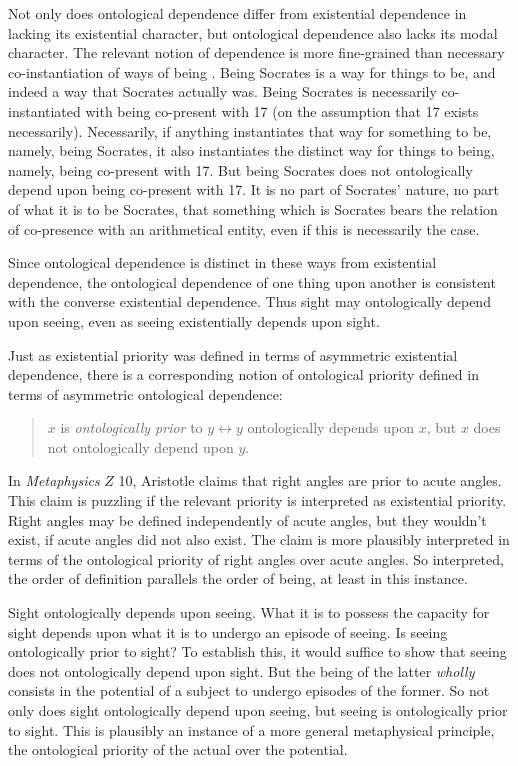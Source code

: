 \documentclass[12pt]{article}
\begin{document}
Not only does ontological dependence differ from existential dependence in lacking its existential character, but ontological dependence also lacks its modal character. The relevant notion of dependence is more fine-grained than necessary co-instantiation of ways of being \citep[see][]{Fine:1994uq,Fine:1995ls,Rosen:2010kx}. Being Socrates is a way for things to be, and indeed a way that Socrates actually was. Being Socrates is necessarily co-instantiated with being co-present with 17 (on the assumption that 17 exists necessarily). Necessarily, if anything instantiates that way for something to be, namely, being Socrates, it also instantiates the distinct way for things to being, namely, being co-present with 17. But being Socrates does not ontologically depend upon being co-present with 17. It is no part of Socrates' nature, no part of what it is to be Socrates, that something which is Socrates bears the relation of co-presence with an arithmetical entity, even if this is necessarily the case.

Since ontological dependence is distinct in these ways from existential dependence, the ontological dependence of one thing upon another is consistent with the converse existential dependence. Thus sight may ontologically depend upon seeing, even as seeing existentially depends upon sight.

Just as existential priority was defined in terms of asymmetric existential dependence, there is a corresponding notion of ontological priority defined in terms of asymmetric ontological dependence:
\begin{quote}
	\( x \) is \emph{ontologically prior} to \( y  \leftrightarrow  y \) ontologically depends upon \( x \), but \( x \) does not ontologically depend upon \( y \).
\end{quote}
In \emph{Metaphysics} \( Z \) 10, Aristotle claims that right angles are prior to acute angles. This claim is puzzling if the relevant priority is interpreted as existential priority. Right angles may be defined independently of acute angles, but they wouldn't exist, if acute angles did not also exist. The claim is more plausibly interpreted in terms of the ontological priority of right angles over acute angles. So interpreted, the order of definition parallels the order of being, at least in this instance.

Sight ontologically depends upon seeing. What it is to possess the capacity for sight depends upon what it is to undergo an episode of seeing. Is seeing ontologically prior to sight? To establish this, it would suffice to show that seeing does not ontologically depend upon sight. But the being of the latter \emph{wholly} consists in the potential of a subject to undergo episodes of the former. So not only does sight ontologically depend upon seeing, but seeing is ontologically prior to sight. This is plausibly an instance of a more general metaphysical principle, the ontological priority of the actual over the potential.
\end{document}
